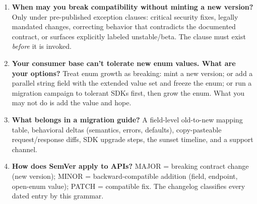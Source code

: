 \begin{enumerate}[label=\textbf{Q\arabic*.}, leftmargin=1.6cm, start=11]
        Caches key primarily on URI; two versions sharing a URI poison each
        other unless responses carry \texttt{Vary} on the versioning header
        and every intermediary honors it~\cite{rfc9110}. URI versioning
        sidesteps the problem entirely.
  \item \textbf{When may you break compatibility without minting a new
        version?}
        Only under pre-published exception clauses: critical security fixes,
        legally mandated changes, correcting behavior that contradicts the
        documented contract, or surfaces explicitly labeled unstable/beta.
        The clause must exist \emph{before} it is invoked.
  \item \textbf{Your consumer base can't tolerate new enum values. What are
        your options?}
        Treat enum growth as breaking: mint a new version; or add a parallel
        string field with the extended value set and freeze the enum; or run
        a migration campaign to tolerant SDKs first, then grow the enum.
        What you may not do is add the value and hope.
  \item \textbf{What belongs in a migration guide?}
        A field-level old-to-new mapping table, behavioral deltas (semantics,
        errors, defaults), copy-pasteable request/response diffs, SDK upgrade
        steps, the sunset timeline, and a support channel.
  \item \textbf{How does SemVer apply to APIs?}
        MAJOR = breaking contract change (new version); MINOR =
        backward-compatible addition (field, endpoint, open-enum value);
        PATCH = compatible fix. The changelog classifies every dated entry
        by this grammar.
\end{enumerate}


